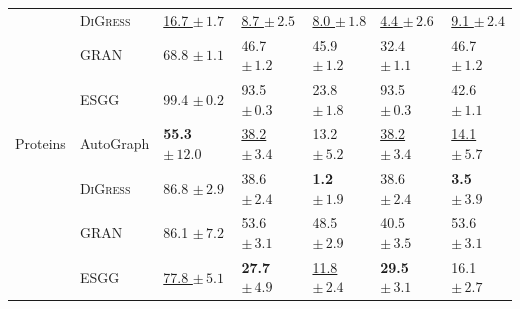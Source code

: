 {\begin{tabular}{lllllll}
         & \textsc{DiGress} & \underline{16.7 $\pm\,\scriptstyle{1.7}$} & \underline{8.7 $\pm\,\scriptstyle{2.5}$} & \underline{8.0 $\pm\,\scriptstyle{1.8}$} & \underline{4.4 $\pm\,\scriptstyle{2.6}$} & \underline{9.1 $\pm\,\scriptstyle{2.4}$} \\
         & GRAN & 68.8 $\pm\,\scriptstyle{1.1}$ & 46.7 $\pm\,\scriptstyle{1.2}$ & 45.9 $\pm\,\scriptstyle{1.2}$ & 32.4 $\pm\,\scriptstyle{1.1}$ & 46.7 $\pm\,\scriptstyle{1.2}$ \\
         & ESGG & 99.4 $\pm\,\scriptstyle{0.2}$ & 93.5 $\pm\,\scriptstyle{0.3}$ & 23.8 $\pm\,\scriptstyle{1.8}$ & 93.5 $\pm\,\scriptstyle{0.3}$ & 42.6 $\pm\,\scriptstyle{1.1}$ \\
        \midrule
        Proteins & AutoGraph & \textbf{55.3 $\pm\,\scriptstyle{12.0}$} & \underline{38.2 $\pm\,\scriptstyle{3.4}$} & 13.2 $\pm\,\scriptstyle{5.2}$ & \underline{38.2 $\pm\,\scriptstyle{3.4}$} & \underline{14.1 $\pm\,\scriptstyle{5.7}$} \\
         & \textsc{DiGress} & 86.8 $\pm\,\scriptstyle{2.9}$ & 38.6 $\pm\,\scriptstyle{2.4}$ & \textbf{1.2 $\pm\,\scriptstyle{1.9}$} & 38.6 $\pm\,\scriptstyle{2.4}$ & \textbf{3.5 $\pm\,\scriptstyle{3.9}$} \\
         & GRAN & 86.1 $\pm\,\scriptstyle{7.2}$ & 53.6 $\pm\,\scriptstyle{3.1}$ & 48.5 $\pm\,\scriptstyle{2.9}$ & 40.5 $\pm\,\scriptstyle{3.5}$ & 53.6 $\pm\,\scriptstyle{3.1}$ \\
         & ESGG & \underline{77.8 $\pm\,\scriptstyle{5.1}$} & \textbf{27.7 $\pm\,\scriptstyle{4.9}$} & \underline{11.8 $\pm\,\scriptstyle{2.4}$} & \textbf{29.5 $\pm\,\scriptstyle{3.1}$} & 16.1 $\pm\,\scriptstyle{2.7}$ \\
\bottomrule
\end{tabular}}